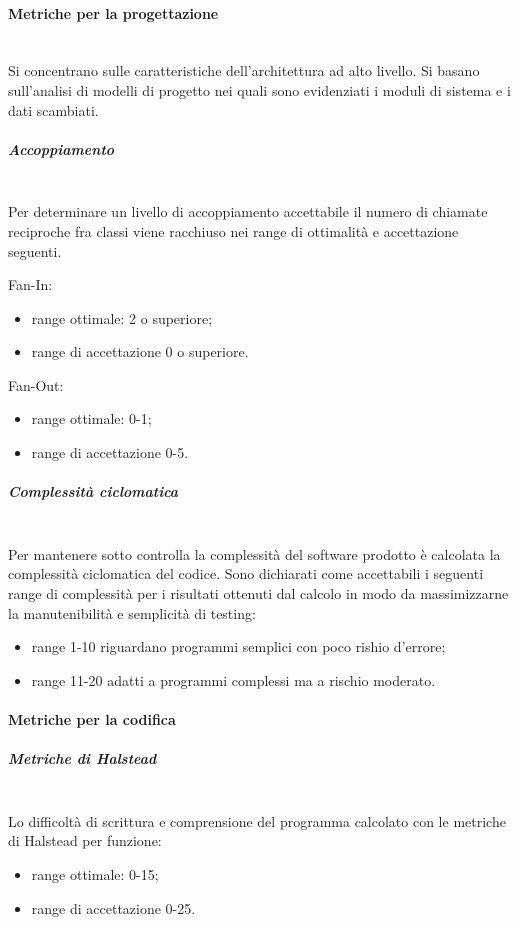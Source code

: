 \paragraph{Metriche per la progettazione}\mbox{}\\
Si concentrano sulle caratteristiche dell'architettura ad alto livello. Si basano sull'analisi di modelli di progetto nei quali sono evidenziati i moduli di sistema e i dati scambiati.

\subparagraph{Accoppiamento}\mbox{}\\
Per determinare un livello di accoppiamento accettabile il numero di chiamate reciproche fra classi viene racchiuso nei range di ottimalità e accettazione seguenti.

Fan-In:
\begin{itemize}
	\item range ottimale: 2 o superiore;
	\item range di accettazione 0 o superiore.
\end{itemize}

Fan-Out:
\begin{itemize}
	\item range ottimale: 0-1;
	\item range di accettazione 0-5.
\end{itemize}

\subparagraph{Complessità ciclomatica}\mbox{}\\
Per mantenere sotto controlla la complessità del software prodotto è calcolata la complessità ciclomatica del codice. 
Sono dichiarati come accettabili i seguenti range di complessità per i risultati ottenuti dal calcolo in modo da massimizzarne la manutenibilità e semplicità di testing: 
\begin{itemize}
	\item range 1-10 riguardano programmi semplici con poco rishio d'errore;
	\item range 11-20 adatti a programmi complessi ma a rischio moderato.
\end{itemize}

\paragraph{Metriche per la codifica}\mbox{}
\subparagraph{Metriche di Halstead}\mbox{}\\

Lo difficoltà di scrittura e comprensione del programma calcolato con le metriche di Halstead per funzione:
\begin{itemize}
	\item range ottimale: 0-15;
	\item range di accettazione 0-25.
\end{itemize}

